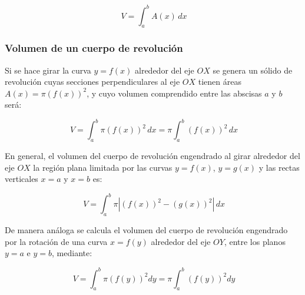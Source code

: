 \[
\ V = \int_{a}^{b}{A(x)\,dx}
\]

\subsubsection*{Volumen de un cuerpo de revolución}
Si se hace girar la curva $y=f(x)$ alrededor del eje $OX$ se genera un sólido
de revolución cuyas secciones perpendiculares al eje $OX$ tienen áreas
$A(x)=\pi(f(x))^{2}$, y cuyo volumen comprendido entre las abscisas $a$ y $b$
será:

\[
\ V = \int_{a}^{b}{\pi(f(x))^{2}\,dx}=
\pi\int_{a}^{b}{(f(x))^{2}\,dx}
\]


En general, el volumen del cuerpo de revolución engendrado al girar
alrededor del eje $OX$ la región plana limitada por las curvas
$y=f(x)$, $y=g(x)$ y las rectas verticales $x=a$ y $x=b$ es:

\[
\ V = \int_{a}^{b}{\pi|(f(x))^{2}-(g(x))^{2}|\,dx}
\]

De manera análoga se calcula el volumen del cuerpo de revolución
engendrado por la rotación de una curva $x=f(y)$ alrededor del eje
$OY$, entre los planos $y=a$ e $y=b$, mediante:

\[
\ V = \int_{a}^{b}{\pi(f(y))^{2}dy} = \pi \int_{a}^{b}{(f(y))^{2}dy}
\]

\newpage

